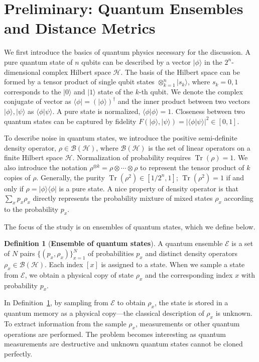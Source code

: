 \documentclass[aps,prx,reprint,superscriptaddress,amsmath,amssymb,longbibliography,floatfix]{revtex4-2}
\providecommand{\bra}[1]{\langle #1|}
\providecommand{\ket}[1]{|#1 \rangle}
\providecommand{\braket}[2]{\langle #1|#2 \rangle}
\providecommand{\ketbra}[2]{|#1\rangle \langle #2|}
\newcommand{\scB}{\mathcal{B}}
\newcommand{\scE}{\mathcal{E}}
\newcommand{\scH}{\mathcal{H}}
\newcommand{\Tr}{\operatorname{Tr}}
\theoremstyle{plain}
\theoremstyle{definition}
\newtheorem{definition}[theorem]{Definition}
\theoremstyle{remark}
\begin{document}
\section{Preliminary: Quantum Ensembles and Distance Metrics}\label{Sec: ensembles and measures}


We first introduce the basics of quantum physics necessary for the discussion. A pure quantum state of $n$ qubits can be described by a vector $\ket{\phi}$ in the $2^n$-dimensional complex Hilbert space $\scH$. The basis of the Hilbert space can be formed by a tensor product of single qubit states $\otimes_{k=1}^n\ket{s_k} $, where $s_k=0,1$ corresponds to the $\ket{0}$ and $\ket{1}$ state of the $k$-th qubit. We denote the complex conjugate of vector as $\bra{\phi}=(\ket{\phi})^\dagger$ and the inner product between two vectors $\ket{\phi}, \ket{\psi}$ as $\braket{\phi}{\psi}$. A pure state is normalized, $\braket{\phi}{\phi}=1$. Closeness between two quantum states can be captured by fidelity $F(\ket{\phi},\ket{\psi})=|\braket{\phi}{\psi}|^2\in[0,1]$.

To describe noise in quantum states, we introduce the positive semi-definite density operator, $\rho\in \scB(\scH)$, where $\scB(\scH)$ is the set of linear operators on a finite Hilbert space $\scH$. Normalization of probability requires $\Tr(\rho) = 1$. We also introduce the notation $\rho^{\otimes k}=\rho\otimes \cdots\otimes \rho$ to represent the tensor product of $k$ copies of $\rho$. Generally, the purity $\Tr(\rho^2)\in[1/2^n, 1]$; $\Tr(\rho^2)=1$ if and only if $\rho=\ketbra{\phi}{\phi}$ is a pure state. A nice property of density operator is that $\sum_x p_x \rho_x$ directly represents the probability mixture of mixed states $\rho_x$ according to the probability $p_x$.

The focus of the study is on ensembles of quantum states, which we define below.

\begin{definition}[\textbf{Ensemble of quantum states}]
    A quantum ensemble $\scE$ is a set of $N$ pairs $\{(p_x,\rho_x)\}_{x=1}^N$ of probabilities $p_x$ and distinct density operators $\rho_x\in \scB(\scH)$. Each index $[x]$ is assigned to a state. When we sample a state from $\scE$, we obtain a physical copy of state $\rho_x$ and the corresponding index $x$ with probability $p_x$. \label{def: quantum ensemble}
\end{definition}
In Definition~\ref{def: quantum ensemble}, by sampling from $\scE$ to obtain $\rho_x$, the state is stored in a quantum memory as a physical copy---the classical description of $\rho_x$ is unknown. To extract information from the sample $\rho_x$, measurements or other quantum operations are performed. The problem becomes interesting as quantum measurements are destructive and unknown quantum states cannot be cloned perfectly.
\end{document}
